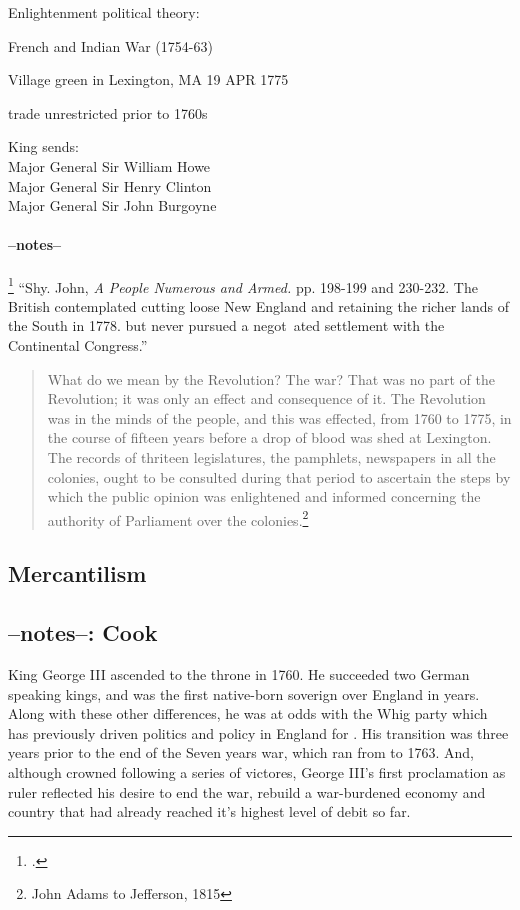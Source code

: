 Enlightenment political theory:

French and Indian War (1754-63)

Village green in Lexington, MA 19 APR 1775

trade unrestricted prior to 1760s

King sends:\\
Major General Sir William Howe\\
Major General Sir Henry Clinton\\
Major General Sir John Burgoyne

\paragraph{--notes--}\footcite[]{}
``Shy. John, \emph{A People Numerous and Armed.} pp. 198-199 and 230-232. The British contemplated cutting loose New England and retaining the richer lands of the South in 1778. but never pursued a negot~ated settlement with the Continental Congress.''


\begin{quotation}
  What do we mean by the Revolution? The war? That was no part of the Revolution;
  it was only an effect and consequence of it. The Revolution was in the minds of
  the people, and this was effected, from 1760 to 1775, in the course of
  fifteen years before a drop of blood was shed at Lexington. The records of
  thriteen legislatures, the pamphlets, newspapers in all the colonies, ought
  to be consulted during that period to ascertain the steps by which the public
  opinion was enlightened and informed concerning the authority of Parliament
  over the colonies.\footnote{John Adams to Jefferson, 1815}
\end{quotation}

\subsection{Mercantilism}

\subsection{--notes--: Cook}

King George III ascended to the throne in 1760. He succeeded two German
speaking kings, and was the first native-born soverign over England in
 years. Along with these other differences, he was at odds with the
Whig party which has previously driven politics and policy in England for
. His transition was three years prior to the end of the Seven
years war, which ran from  to 1763. And, although crowned following a
series of victores, George III's first proclamation as ruler reflected his
desire to end the war, rebuild a war-burdened economy and country that had
already reached it's highest level of debit so far.


